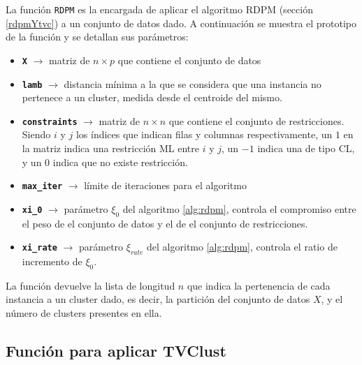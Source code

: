 La función \texttt{RDPM} es la encargada de aplicar el algoritmo \acs{RDPM} (sección \ref{rdpmYtvc}) a un conjunto de datos dado. A continuación se muestra el prototipo de la función y se detallan sus parámetros:


\begin{itemize}
	
	\item \textbf{\texttt{X}} {$\longrightarrow$ matriz de $n \times p$ que contiene el conjunto de datos}
	
	\item \textbf{\texttt{lamb}} {$\longrightarrow$ distancia mínima a la que se considera que una instancia no pertenece a un cluster, medida desde el centroide del mismo.}
	
	\item \textbf{\texttt{constraints}} {$\longrightarrow$ matriz de $n \times n$ que contiene el conjunto de restricciones. Siendo $i$ y $j$ los índices que indican filas y columnas respectivamente, un $1$ en la matriz indica una restricción \acs{ML} entre $i$ y $j$, un $-1$ indica una de tipo \acs{CL}, y un $0$ indica que no existe restricción.}
	
	\item \textbf{\texttt{max\_iter}} {$\longrightarrow$ límite de iteraciones para el algoritmo}
	
	\item \textbf{\texttt{xi\_0}} {$\longrightarrow$ parámetro $\xi_0$ del algoritmo \ref{alg:rdpm}, controla el compromiso entre el peso de el conjunto de datos y el de el conjunto de restricciones.}
	
	\item \textbf{\texttt{xi\_rate}} {$\longrightarrow$ parámetro $\xi_{rate}$ del algoritmo \ref{alg:rdpm}, controla el ratio de incremento de $\xi_0$.}
	
\end{itemize}

La función devuelve la lista de longitud $n$ que indica la pertenencia de cada instancia a un cluster dado, es decir, la partición del conjunto de datos $X$, y el número de clusters presentes en ella.

\subsection{Función para aplicar TVClust}


